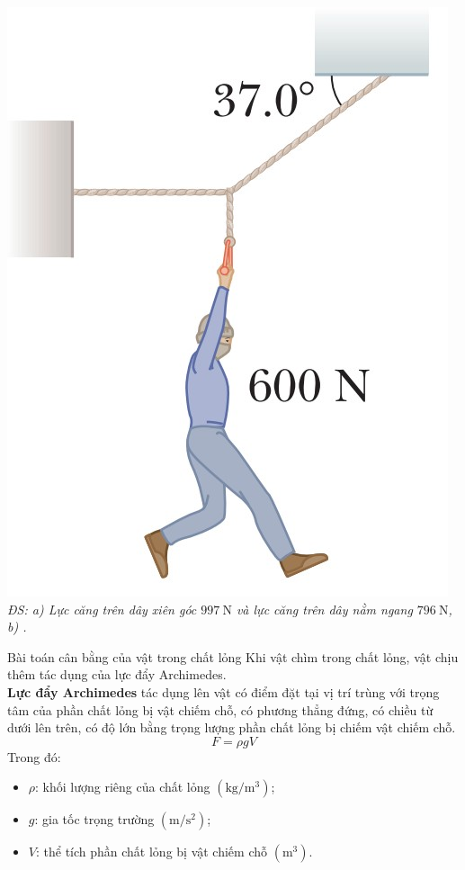\begin{tomtat}
\begin{vd}
	{\includegraphics[scale=0.4]{figs/BTMASAT-6}}
	\null\hfill \textit{ĐS: a) Lực căng trên dây xiên góc $\SI{997}{\newton}$ và lực căng trên dây nằm ngang $\SI{796}{\newton}$, b) \LARGE\Laughey.}
\end{vd}
\begin{dang}{Bài toán cân bằng của vật trong chất lỏng}
Khi vật chìm trong chất lỏng, vật chịu thêm tác dụng của lực đẩy Archimedes.\\
\textbf{Lực đẩy Archimedes} tác dụng lên vật có điểm đặt tại vị trí trùng với trọng tâm của phần chất lỏng bị vật chiếm chỗ, có phương thẳng đứng, có chiều từ dưới lên trên, có độ lớn bằng trọng lượng phần chất lỏng bị chiếm vật chiếm chỗ.
$$F=\rho gV$$
Trong đó:
\begin{itemize}
	\item $\rho$: khối lượng riêng của chất lỏng $\left(\si{\kilogram/\meter^3}\right)$;
	\item $g$: gia tốc trọng trường $\left(\si{\meter/\second^2}\right)$;
	\item $V$: thể tích phần chất lỏng bị vật chiếm chỗ $\left(\si{\meter^3}\right)$.

\end{itemize}
\end{dang}
\end{tomtat}
